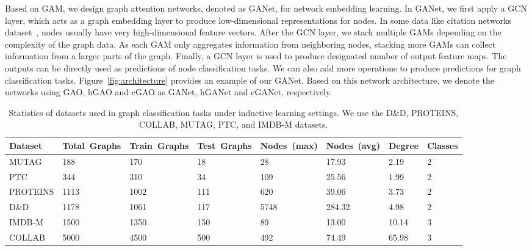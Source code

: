 \documentclass[sigconf]{acmart}
\begin{document}
Based on GAM, we design graph attention networks, denoted as GANet,
for network embedding learning. In GANet, we first apply a GCN
layer, which acts as a graph embedding layer to produce
low-dimensional representations for nodes. In some data like
citation networks dataset~\cite{kipf2016semi}, nodes usually have
very high-dimensional feature vectors. After the GCN layer, we stack
multiple GAMs depending on the complexity of the graph data. As each
GAM only aggregates information from neighboring nodes, stacking
more GAMs can collect information from a larger parts of the graph.
Finally, a GCN layer is used to produce designated number of output
feature maps. The outputs can be directly used as predictions of
node classification tasks. We can also add more operations to
produce predictions for graph classification tasks.
Figure~\ref{fig:architecture} provides an example of our GANet.
Based on this network architecture, we denote the networks using
GAO, hGAO and cGAO as GANet, hGANet and cGANet, respectively.


\begin{table*}[t]
\centering \caption{Statistics of datasets used in graph classification tasks under inductive
learning settings. We use the D\&D, PROTEINS, COLLAB, MUTAG, PTC, and IMDB-M datasets.
}\label{table:inducdatasets}
\begin{tabularx}{\textwidth}{  XYYYYYYY }
    \hline
    \textbf{Dataset} & \textbf{Total~Graphs} & \textbf{Train~Graphs} & \textbf{Test~Graphs} &
    \textbf{Nodes~(max)} & \textbf{Nodes~(avg)} & \textbf{Degree} & \textbf{Classes} \\ \hline\hline
    MUTAG     & 188  & 170  & 18   & 28   & 17.93   & 2.19  & 2  \\ \hline
    PTC       & 344  & 310  & 34   & 109  & 25.56   & 1.99  & 2  \\ \hline
    PROTEINS  & 1113 & 1002 & 111  & 620  & 39.06   & 3.73  & 2  \\ \hline
    D\&D      & 1178 & 1061 & 117  & 5748 & 284.32  & 4.98  & 2  \\ \hline
    IMDB-M    & 1500 & 1350 & 150  & 89   & 13.00   & 10.14 & 3  \\ \hline
    COLLAB    & 5000 & 4500 & 500  & 492  & 74.49   & 65.98 & 3  \\ \hline
    \hline
\end{tabularx}
\end{table*}
\end{document}
